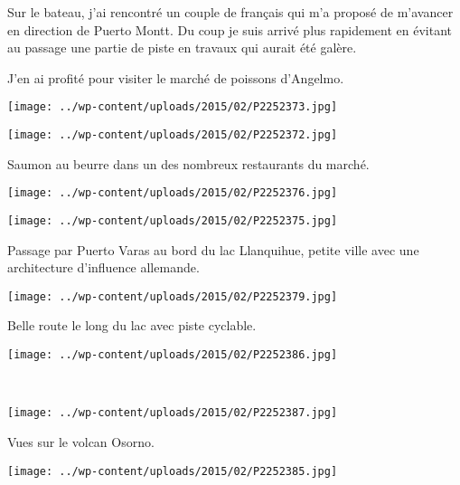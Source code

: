 \pagebreak
Sur le bateau, j'ai rencontré un couple de français qui m'a proposé de m'avancer en direction de Puerto Montt. Du coup je suis arrivé plus rapidement en évitant au passage une partie de piste en travaux qui aurait été galère.

 J'en ai profité pour visiter le marché de poissons d'Angelmo.
\begin{center} \texttt{[image: ../wp-content/uploads/2015/02/P2252373.jpg]} \end{center}
\begin{center} \texttt{[image: ../wp-content/uploads/2015/02/P2252372.jpg]} \end{center}
\vspace{-\topsep}
\vspace{-1.25mm}

\pagebreak
  Saumon au beurre dans un des nombreux restaurants du marché.
\begin{center} \texttt{[image: ../wp-content/uploads/2015/02/P2252376.jpg]} \end{center}
\begin{center} \texttt{[image: ../wp-content/uploads/2015/02/P2252375.jpg]} \end{center}
\vspace{-\topsep}
\vspace{-3.25mm}

\pagebreak
  Passage par Puerto Varas au bord du lac Llanquihue, petite ville avec une architecture d'influence allemande.
\begin{center} \texttt{[image: ../wp-content/uploads/2015/02/P2252379.jpg]} \end{center}

Belle route le long du lac avec piste cyclable.
\begin{center} \texttt{[image: ../wp-content/uploads/2015/02/P2252386.jpg]} \end{center}
\vspace{-\topsep}
\pagebreak
~\\
\begin{center} \texttt{[image: ../wp-content/uploads/2015/02/P2252387.jpg]} \end{center}

 Vues sur le volcan Osorno.
\begin{center} \texttt{[image: ../wp-content/uploads/2015/02/P2252385.jpg]} \end{center}
\vspace{-\topsep}

